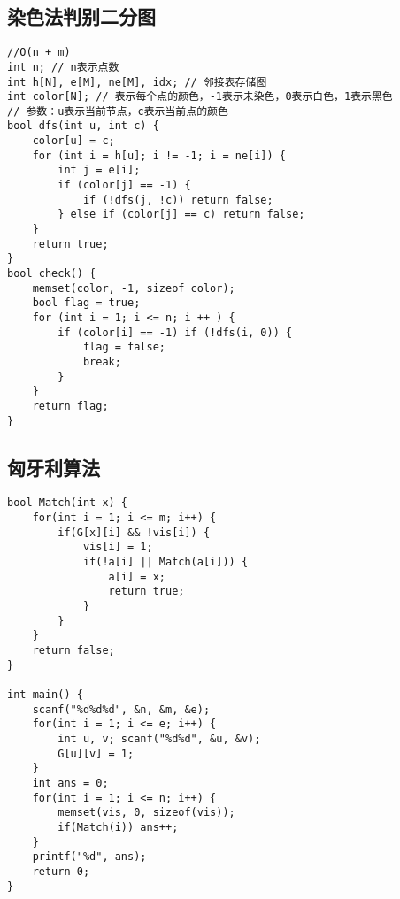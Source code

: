\subsection{染色法判别二分图}
\begin{lstlisting}
//O(n + m)
int n; // n表示点数
int h[N], e[M], ne[M], idx; // 邻接表存储图
int color[N]; // 表示每个点的颜色，-1表示未染色，0表示白色，1表示黑色
// 参数：u表示当前节点，c表示当前点的颜色
bool dfs(int u, int c) {
	color[u] = c;
	for (int i = h[u]; i != -1; i = ne[i]) {
		int j = e[i];
		if (color[j] == -1) {
			if (!dfs(j, !c)) return false;
		} else if (color[j] == c) return false;
	}
	return true;
}
bool check() {
	memset(color, -1, sizeof color);
	bool flag = true;
	for (int i = 1; i <= n; i ++ ) {
		if (color[i] == -1) if (!dfs(i, 0)) {
			flag = false;
			break;
		}
	}
	return flag;
}
\end{lstlisting}

\subsection{匈牙利算法}
\begin{lstlisting}
bool Match(int x) {
	for(int i = 1; i <= m; i++) {
		if(G[x][i] && !vis[i]) {
			vis[i] = 1;
			if(!a[i] || Match(a[i])) {
				a[i] = x;
				return true;
			}
		}
	}
	return false;
}

int main() {
	scanf("%d%d%d", &n, &m, &e);
	for(int i = 1; i <= e; i++) {
		int u, v; scanf("%d%d", &u, &v);
		G[u][v] = 1;
	}
	int ans = 0;
	for(int i = 1; i <= n; i++) {
		memset(vis, 0, sizeof(vis));
		if(Match(i)) ans++;
	}
	printf("%d", ans);
	return 0;
}
\end{lstlisting}

